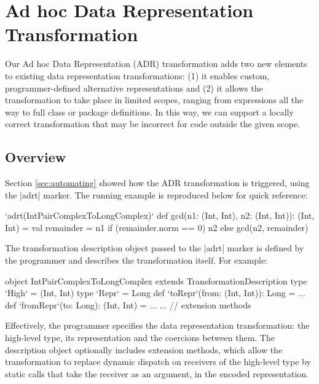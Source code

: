\section{Ad hoc Data Representation Transformation}
\label{sec:ildl}

Our Ad hoc Data Representation (ADR) transformation adds two new
elements to existing data representation transformations: (1) it
enables custom, programmer-defined alternative representations and
(2) it allows the transformation to take place in limited scopes,
ranging from expressions all the way to full class or package
definitions. In this way, we can support a locally correct
transformation that may be incorrect for code outside the given scope.

\subsection{Overview}
\label{sec:ildl:user-story}

Section \ref{sec:automating} showed how the ADR transformation is triggered, using the |adrt| marker. The running example is reproduced below for quick
reference:

\begin{lstlisting-nobreak}
`adrt(IntPairComplexToLongComplex)` {
  def gcd(n1: (Int, Int), n2: (Int, Int)): (Int, Int) = {
    val remainder = n1 %
    if (remainder.norm == 0) n2 else gcd(n2, remainder)
  }
}
\end{lstlisting-nobreak}

The transformation description object passed to the |adrt| marker is defined by the programmer and describes the transformation itself. For example:

\begin{lstlisting-nobreak}
object IntPairComplexToLongComplex extends TransformationDescription {
  type `High` = (Int, Int)
  type `Repr` = Long
  def `toRepr`(from: (Int, Int)): Long = ...
  def `fromRepr`(to: Long): (Int, Int) = ...
  ... // extension methods
}
\end{lstlisting-nobreak}

Effectively, the programmer specifies the data representation transformation: the high-level type, its representation and the coercions between them. The description object optionally includes extension methods, which allow the transformation to replace dynamic dispatch on receivers of the high-level type by static calls that take the receiver as an argument, in the encoded representation.

